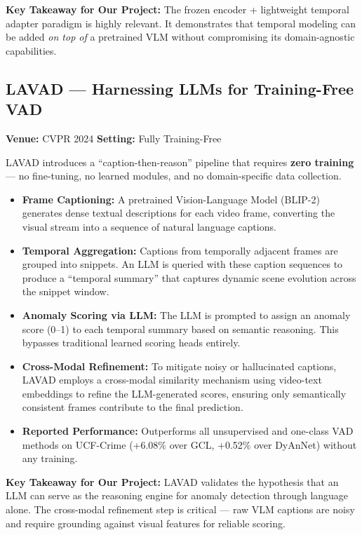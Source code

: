 \documentclass[12pt, a4paper]{article}
\begin{document}
\textbf{Key Takeaway for Our Project:} The frozen encoder + lightweight temporal adapter paradigm is highly relevant. It demonstrates that temporal modeling can be added \textit{on top of} a pretrained VLM without compromising its domain-agnostic capabilities.

\subsection{LAVAD --- Harnessing LLMs for Training-Free VAD \cite{zanella2024lavad}}

\textbf{Venue:} CVPR 2024 \hfill \textbf{Setting:} Fully Training-Free

LAVAD introduces a ``caption-then-reason'' pipeline that requires \textbf{zero training} --- no fine-tuning, no learned modules, and no domain-specific data collection.

\begin{itemize}[leftmargin=*]
    \item \textbf{Frame Captioning:} A pretrained Vision-Language Model (BLIP-2) generates dense textual descriptions for each video frame, converting the visual stream into a sequence of natural language captions.
    
    \item \textbf{Temporal Aggregation:} Captions from temporally adjacent frames are grouped into snippets. An LLM is queried with these caption sequences to produce a ``temporal summary'' that captures dynamic scene evolution across the snippet window.
    
    \item \textbf{Anomaly Scoring via LLM:} The LLM is prompted to assign an anomaly score (0--1) to each temporal summary based on semantic reasoning. This bypasses traditional learned scoring heads entirely.
    
    \item \textbf{Cross-Modal Refinement:} To mitigate noisy or hallucinated captions, LAVAD employs a cross-modal similarity mechanism using video-text embeddings to refine the LLM-generated scores, ensuring only semantically consistent frames contribute to the final prediction.
    
    \item \textbf{Reported Performance:} Outperforms all unsupervised and one-class VAD methods on UCF-Crime (+6.08\% over GCL, +0.52\% over DyAnNet) without any training.
\end{itemize}

\textbf{Key Takeaway for Our Project:} LAVAD validates the hypothesis that an LLM can serve as the reasoning engine for anomaly detection through language alone. The cross-modal refinement step is critical --- raw VLM captions are noisy and require grounding against visual features for reliable scoring.
\end{document}
